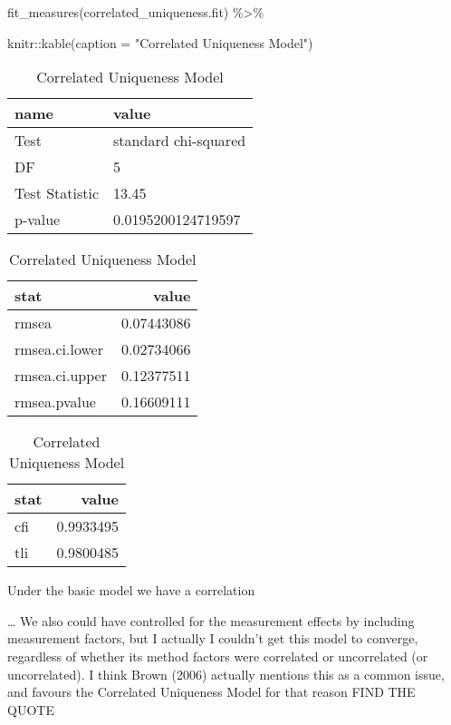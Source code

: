 \documentclass[
  letterpaper,
  DIV=11,
  numbers=noendperiod]{scrreprt}
\newenvironment{Shaded}{\begin{snugshade}}{\end{snugshade}}
\newcommand{\AttributeTok}[1]{\textcolor[rgb]{0.40,0.45,0.13}{#1}}
\newcommand{\FunctionTok}[1]{\textcolor[rgb]{0.28,0.35,0.67}{#1}}
\newcommand{\NormalTok}[1]{\textcolor[rgb]{0.00,0.23,0.31}{#1}}
\newcommand{\SpecialCharTok}[1]{\textcolor[rgb]{0.37,0.37,0.37}{#1}}
\newcommand{\StringTok}[1]{\textcolor[rgb]{0.13,0.47,0.30}{#1}}
\begin{document}
\begin{Shaded}
\begin{Highlighting}[]
\FunctionTok{fit\_measures}\NormalTok{(correlated\_uniqueness.fit) }\SpecialCharTok{\%\textgreater{}\%} 
  
\NormalTok{  knitr}\SpecialCharTok{::}\FunctionTok{kable}\NormalTok{(}\AttributeTok{caption =} \StringTok{"Correlated Uniqueness Model"}\NormalTok{)}
\end{Highlighting}
\end{Shaded}

\begin{table}
\caption{Correlated Uniqueness Model}

\centering
\begin{tabular}[t]{l|l}
\hline
name & value\\
\hline
Test & standard chi-squared\\
\hline
DF & 5\\
\hline
Test Statistic & 13.45\\
\hline
p-value & 0.0195200124719597\\
\hline
\end{tabular}
\centering
\begin{tabular}[t]{l|r}
\hline
stat & value\\
\hline
rmsea & 0.07443086\\
\hline
rmsea.ci.lower & 0.02734066\\
\hline
rmsea.ci.upper & 0.12377511\\
\hline
rmsea.pvalue & 0.16609111\\
\hline
\end{tabular}
\centering
\begin{tabular}[t]{l|r}
\hline
stat & value\\
\hline
cfi & 0.9933495\\
\hline
tli & 0.9800485\\
\hline
\end{tabular}
\end{table}

Under the basic model we have a correlation

\ldots{} We also could have controlled for the measurement effects by
including measurement factors, but I actually I couldn't get this model
to converge, regardless of whether its method factors were correlated or
uncorrelated (or uncorrelated). I think Brown (2006) actually mentions
this as a common issue, and favours the Correlated Uniqueness Model for
that reason FIND THE QUOTE
\end{document}
